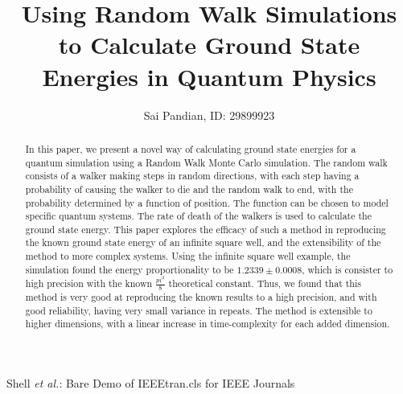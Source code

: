 \documentclass[journal]{IEEEtran}
\begin{document}
\title{Using Random Walk Simulations to Calculate Ground State Energies in
  Quantum Physics}

\author{Sai Pandian, ID: 29899923}%
        
{Shell \MakeLowercase{\textit{et al.}}: Bare Demo of IEEEtran.cls for IEEE Journals}

\maketitle

\begin{abstract}
  In this paper, we present a novel way of calculating ground state energies for
  a quantum simulation using a Random Walk Monte Carlo simulation. The random
  walk consists of a walker making steps in random directions, with each step
  having a probability of causing the walker to die and the random walk to end,
  with the probability determined by a function of position. The function can be
  chosen to model specific quantum systems. The rate of death of the walkers is
  used to calculate the ground state energy. This paper explores the efficacy of
  such a method in reproducing the known ground state energy of an infinite
  square well, and the extensibility of the method to more complex
  systems. Using the infinite square well example, the simulation found the
  energy proportionality to be $1.2339 \pm 0.0008$, which is consister to high
  precision with the known $\frac{pi^2}{8}$ theoretical constant. Thus, we found
  that this method is very good at reproducing the known results to a high
  precision, and with good reliability, having very small variance in
  repeats. The method is extensible to higher dimensions, with a linear increase
  in time-complexity for each added dimension.
\end{abstract}
\end{document}
